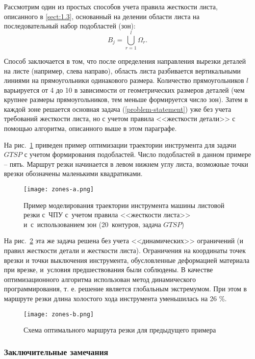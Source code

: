 Рассмотрим один из простых способов учета правила жесткости листа,
описанного в \ref{sect:1.3},
основанный на делении области листа на
последовательный набор подобластей (зон):
$$
  B_j =
  \bigcup_{r=1}^l \Omega_r
  .
$$

Способ заключается в том,
что после определения направления вырезки деталей на листе
(например, слева направо),
область листа разбивается вертикальными линиями
на прямоугольники одинакового размера.
Количество прямоугольников $l$
варьируется от 4 до 10 в зависимости от
геометрических размеров деталей
(чем крупнее размеры прямоугольников,
тем меньше формируется число зон).
Затем в каждой зоне решается основная задача
(\ref{problem-statement})
уже без учета требований жесткости листа,
но с учетом правила <<жесткости детали>>
с помощью  алгоритма, описанного выше в этом параграфе.

На рис.~\ref{zones-a}
приведен пример оптимизации траектории
инструмента для задачи $GTSP$ с учетом
формирования подобластей.
Число подобластей в данном примере -- пять.
Маршрут резки начинается в левом нижнем углу листа,
возможные точки врезки обозначены маленькими квадратиками.

\begin{figure}[H]
  \centering
  \texttt{[image: zones-a.png]}
  \caption{
    Пример моделирования траектории инструмента машины листовой резки с~ЧПУ
    с~учетом правила <<жесткости листа>>
    и~с~использованием зон
    (20~контуров, задача $GTSP$)
    }
  \label{zones-a}
\end{figure}

На рис.~\ref{zones-b}
эта же задача решена без учета
<<динамических>> ограничений
(и правил жесткости детали и жесткости листа).
Ограничения на координаты точек врезки и
точки выключения инструмента,
обусловленные деформацией материала при врезке,
и~условия предшествования были соблюдены.
В качестве оптимизационного алгоритма
использован метод динамического программирования,
т. е. решение является глобальным экстремумом.
При этом в маршруте резки
длина холостого хода инструмента уменьшилась на 26 \%.

\begin{figure}[H]
  \centering
  \texttt{[image: zones-b.png]}
  \caption{
    Схема оптимального маршрута резки для предыдущего примера
  }
  \label{zones-b}
\end{figure}

\subsubsection*{
  Заключительные замечания
}

